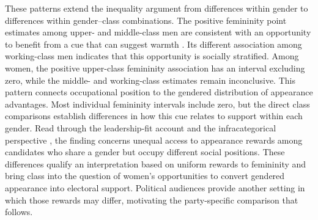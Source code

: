 \documentclass[11pt,a4paper]{article}\usepackage[]{graphicx}\usepackage[]{xcolor}
\begin{document}
These patterns extend the inequality argument from differences within gender to differences within gender--class combinations. The positive femininity point estimates among upper- and middle-class men are consistent with an opportunity to benefit from a cue that can suggest warmth \parencite{CarpinellaJohnson2013b}. Its different association among working-class men indicates that this opportunity is socially stratified. Among women, the positive upper-class femininity association has an interval excluding zero, while the middle- and working-class estimates remain inconclusive. This pattern connects occupational position to the gendered distribution of appearance advantages. Most individual femininity intervals include zero, but the direct class comparisons establish differences in how this cue relates to support within each gender. Read through the leadership-fit account \parencite{Eagly2002} and the infracategorical perspective \parencite{Monk2022}, the finding concerns unequal access to appearance rewards among candidates who share a gender but occupy different social positions. These differences qualify an interpretation based on uniform rewards to femininity and bring class into the question of women's opportunities to convert gendered appearance into electoral support. Political audiences provide another setting in which those rewards may differ, motivating the party-specific comparison that follows.
\end{document}

